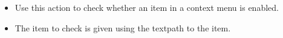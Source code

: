 
\begin{itemize}
\item Use this action to check whether an item in a context menu is enabled.
\item The item to check is given using the textpath to the item. 
\end{itemize}



